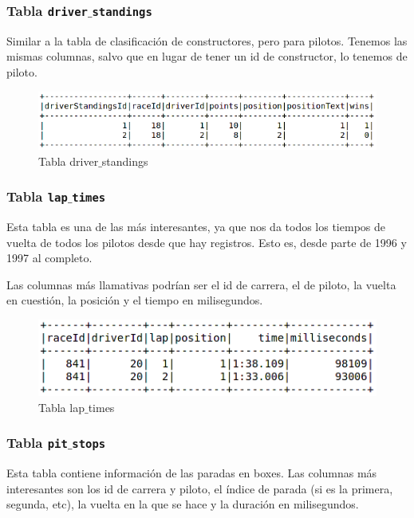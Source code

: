 \documentclass[12pt,twoside,titlepage]{report}
\begin{document}
\subsubsection{Tabla \texttt{driver$\_$standings}}

Similar a la tabla de clasificación de constructores, pero para pilotos. Tenemos las mismas columnas, salvo que en lugar de tener un id de constructor, lo tenemos de piloto. 


\begin{figure}[H]
  \includegraphics[scale=0.5]{driver_standings_table.png}
  \centering
  \caption{Tabla driver$\_$standings}
  \label{fig:drivstands}
  \centering
\end{figure}


\subsubsection{Tabla \texttt{lap$\_$times}}

Esta tabla es una de las más interesantes, ya que nos da todos los tiempos de vuelta de todos los pilotos desde que hay registros. Esto es, desde parte de 1996 y 1997 al completo.

Las columnas más llamativas podrían ser el id de carrera, el de piloto, la vuelta en cuestión, la posición y el tiempo en milisegundos. 

\begin{figure}[H]
  \includegraphics[scale=0.5]{lap_times_table.png}
  \centering
  \caption{Tabla lap$\_$times}
  \label{fig:laptimestab}
  \centering
\end{figure}

\subsubsection{Tabla \texttt{pit$\_$stops}}

Esta tabla contiene información de las paradas en boxes. Las columnas más interesantes son los id de carrera y piloto, el índice de parada (si es la primera, segunda, etc), la vuelta en la que se hace y la duración en milisegundos. 
\end{document}
